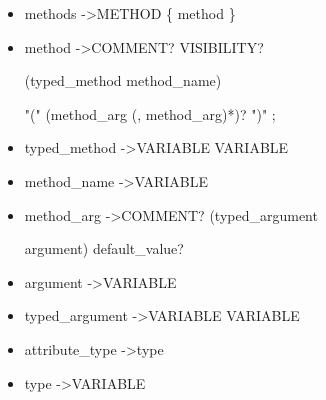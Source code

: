 \begin{itemize}
 \item methods   -\textgreater   METHOD  \{  method  \}

 \item method   -\textgreater   COMMENT?  VISIBILITY?  
 
 (typed{\_}method \textbar method{\_}name)  
 
 "("  (method{\_}arg  (,  method{\_}arg)*)?  ")"  ;

 \item typed{\_}method   -\textgreater   VARIABLE  VARIABLE

 \item method{\_}name   -\textgreater   VARIABLE

 \item method{\_}arg   -\textgreater   COMMENT?  (typed{\_}argument 
 
 \textbar argument)  default{\_}value?

 \item argument   -\textgreater   VARIABLE

 \item typed{\_}argument   -\textgreater   VARIABLE  VARIABLE

 \item attribute{\_}type   -\textgreater   type

 \item type   -\textgreater   VARIABLE

 \end{itemize}